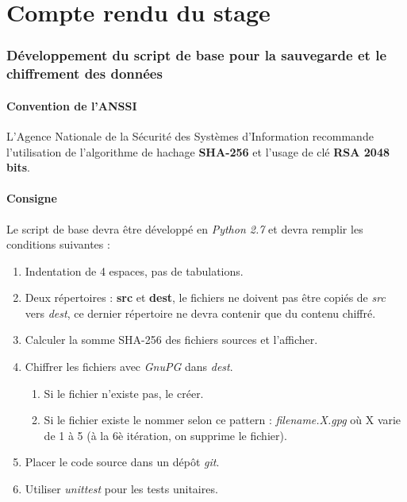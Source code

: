 \part{Compte rendu du stage}

\section{Développement du script de base pour la sauvegarde et le chiffrement des données}

\subsection{Convention de l'ANSSI}

L'Agence Nationale de la Sécurité des Systèmes d'Information recommande l'utilisation de
l'algorithme de hachage \textbf{SHA-256} et l'usage de clé \textbf{RSA 2048 bits}.

\subsection{Consigne}

Le script de base devra être développé en \textit{Python 2.7} et devra remplir les conditions
suivantes :

\begin{enumerate}
     \item Indentation de 4 espaces, pas de tabulations.
     \item Deux répertoires : \textbf{src} et \textbf{dest}, le fichiers ne doivent pas être
     copiés de \textit{src} vers \textit{dest}, ce dernier répertoire ne devra contenir que du
     contenu chiffré.
     \item Calculer la somme SHA-256 des fichiers sources et l'afficher.
     \item Chiffrer les fichiers avec \textit{GnuPG} dans \textit{dest}.

     \begin{enumerate}
          \item Si le fichier n'existe pas, le créer.
          \item Si le fichier existe le nommer selon ce pattern : \textit{filename.X.gpg} où X
          varie de 1 à 5 (à la 6è itération, on supprime le fichier).
     \end{enumerate}

     \item Placer le code source dans un dépôt \textit{git}.
     \item Utiliser \textit{unittest} pour les tests unitaires.
\end{enumerate}

